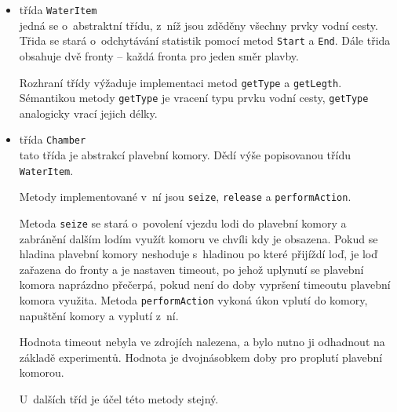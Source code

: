 \documentclass[11pt,a4paper]{article}
\begin{document}
      \begin{itemize}
        \item třída \texttt{WaterItem} \\
              jedná se o~abstraktní třídu, z~níž jsou zděděny všechny prvky
              vodní cesty. Třida se stará o~odchytávání statistik pomocí metod
              \texttt{Start} a \texttt{End}. Dále třida obsahuje dvě fronty 
              -- každá fronta pro jeden směr plavby.

              Rozhraní třídy výžaduje implementaci metod \texttt{getType} a 
              \texttt{getLegth}. Sémantikou metody \texttt{getType} je vracení
              typu prvku vodní cesty, \texttt{getType} analogicky vrací jejich 
              délky.

        \item třída \texttt{Chamber} \\
              tato třída je abstrakcí plavební komory. 
              Dědí výše popisovanou třídu \texttt{WaterItem}.

              Metody implementované v~ní jsou \texttt{seize}, \texttt{release}
              a \texttt{performAction}. 

              Metoda \texttt{seize} se stará o~povolení vjezdu lodi do plavební
              komory a zabránění dalším lodím využít komoru ve chvíli kdy je
              obsazena. Pokud se hladina plavební komory neshoduje s~hladinou
              po které přijíždí loď, je loď zařazena do fronty a je nastaven
              timeout, po jehož uplynutí se plavební komora naprázdno přečerpá,
              pokud není do doby vypršení timeoutu plavební komora využita.
              Metoda \texttt{performAction} vykoná úkon vplutí do komory,
              napuštění komory a vyplutí z~ní.

              Hodnota timeout nebyla ve zdrojích nalezena, a bylo nutno ji
              odhadnout na základě experimentů. Hodnota je dvojnásobkem doby
              pro proplutí plavební komorou.

              U~dalších tříd je účel této metody stejný.


\end{itemize}
\end{document}
